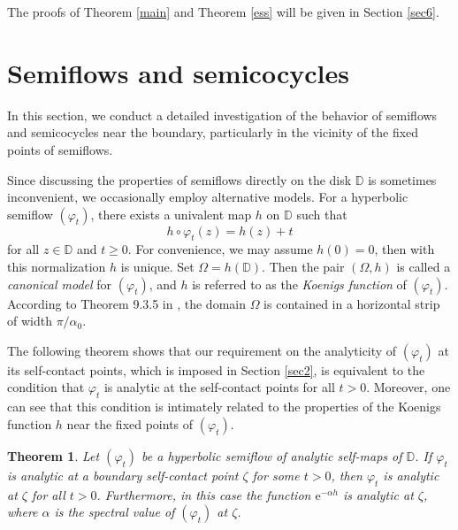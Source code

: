 \documentclass{amsart}
\theoremstyle{proclaim}
\newtheorem{theorem}{Theorem}[section]
\theoremstyle{fancyproclaim}
\theoremstyle{definition}
\theoremstyle{fancystatement}
\numberwithin{equation}{section}
\begin{document}
The proofs of Theorem \ref{main} and Theorem \ref{ess} will be given in Section \ref{sec6}.










\section{Semiflows and semicocycles}\label{sec4}

In this section, we conduct a detailed investigation of the behavior of semiflows and semicocycles near the boundary, particularly in the vicinity of the fixed points of semiflows.

Since discussing the properties of semiflows directly on the disk $\mathbb{D}$ is sometimes inconvenient, we occasionally employ alternative models. For a hyperbolic semiflow $(\varphi_t)$, there exists a univalent map $h$ on $\mathbb{D}$ such that
$$h\circ\varphi_t(z)=h(z)+t$$
for all $z\in\mathbb{D}$ and $t\geq 0$. For convenience, we may assume $h(0) = 0$, then with this normalization $h$ is unique. Set $\Omega =h(\mathbb{D})$. Then the pair $(\Omega, h)$ is called a \emph{canonical model} for $(\varphi_t)$, and $h$ is referred to as the  \emph{Koenigs function} of  $(\varphi_t)$. According to Theorem 9.3.5 in \cite{cs}, the domain $\Omega$ is contained in a horizontal strip of width $\pi/\alpha_0$.

The following theorem shows that our requirement on the analyticity of $(\varphi_t)$ at its self-contact points, which is imposed in Section \ref{sec2},  is equivalent to the condition that $\varphi_t$ is analytic at the  self-contact points for all $t>0$. Moreover, one can see that this condition is intimately related to the properties of the Koenigs function $h$ near the fixed points of $(\varphi_t)$.

\begin{theorem}\label{ana}
Let $(\varphi_t)$ be a hyperbolic semiflow of analytic self-maps of $\mathbb{D}$. If $\varphi_t$ is analytic at a boundary self-contact point $\zeta$ for some $t > 0$, then $\varphi_t$ is analytic at  $\zeta$ for all $t > 0$. Furthermore, in this case the function $\mathrm{e}^{-\alpha h}$ is analytic at $\zeta$, where $\alpha$ is the spectral value of $(\varphi_t)$ at $\zeta$.
\end{theorem}
\end{document}
